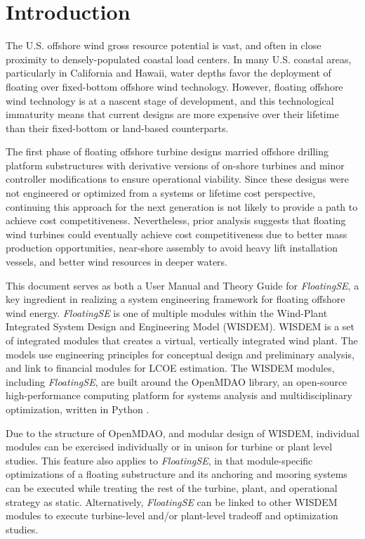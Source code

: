 \chapter{Introduction}
\label{sec:intro}
The U.S. offshore wind gross resource potential is vast, and often in
close proximity to densely-populated coastal load centers. In many
U.S. coastal areas, particularly in California and Hawaii, water depths
favor the deployment of floating over fixed-bottom offshore wind
technology. However, floating offshore wind technology is at a nascent
stage of development, and this technological immaturity means that
current designs are more expensive over their lifetime than their
fixed-bottom or land-based counterparts.

The first phase of floating offshore turbine designs married offshore
drilling platform substructures with derivative versions of on-shore
turbines and minor controller modifications to ensure operational
viability.  Since these designs were not engineered or optimized from a
systems or lifetime cost perspective, continuing this approach for the
next generation is not likely to provide a path to achieve cost
competitiveness. Nevertheless, prior analysis suggests that floating
wind turbines could eventually achieve cost competitiveness due to
better mass production opportunities, near-shore assembly to avoid heavy
lift installation vessels, and better wind resources in deeper
waters.

This document serves as both a User Manual and Theory Guide for
\textit{FloatingSE}, a key ingredient in realizing a system engineering
framework for floating offshore wind energy. \textit{FloatingSE} is one
of multiple modules within the Wind-Plant Integrated System Design and
Engineering Model (WISDEM).  WISDEM is a set of integrated modules that
creates a virtual, vertically integrated wind plant. The models use
engineering principles for conceptual design and preliminary analysis,
and link to financial modules for LCOE estimation.  The WISDEM modules,
including \textit{FloatingSE}, are built around the OpenMDAO library, an
open-source high-performance computing platform for systems analysis and
multidisciplinary optimization, written in Python \citep{openmdao}.

Due to the structure of OpenMDAO, and modular design of WISDEM, individual
modules can be exercised individually or in unison for turbine or plant
level studies.  This feature also applies to \textit{FloatingSE}, in
that module-specific optimizations of a floating substructure and its
anchoring and mooring systems can be executed while treating the rest
of the turbine, plant, and operational strategy as static.
Alternatively, \textit{FloatingSE} can be linked to other WISDEM modules
to execute turbine-level and/or plant-level tradeoff and optimization
studies.

